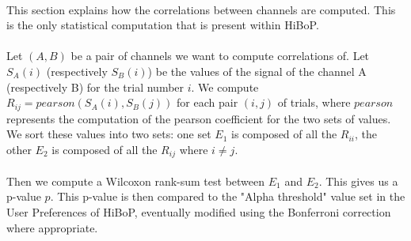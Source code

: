 \documentclass[a4paper]{article}
\begin{document}
\paragraph{} This section explains how the correlations between channels are computed. This is the only statistical computation that is present within HiBoP.
\paragraph{} Let $(A,B)$ be a pair of channels we want to compute correlations of. Let $S_A(i)$ (respectively $S_B(i)$) be the values of the signal of the channel A (respectively B) for the trial number $i$. We compute $R_{ij} = pearson(S_A(i),S_B(j))$ for each pair $(i,j)$ of trials, where $pearson$ represents the computation of the pearson coefficient for the two sets of values. We sort these values into two sets: one set $E_1$ is composed of all the $R_{ii}$, the other $E_2$ is composed of all the $R_{ij}$ where $i \neq j$.
\paragraph{} Then we compute a Wilcoxon rank-sum test between $E_1$ and $E_2$. This gives us a p-value $p$. This p-value is then compared to the "Alpha threshold" value set in the User Preferences of HiBoP, eventually modified using the Bonferroni correction where appropriate.
\end{document}
